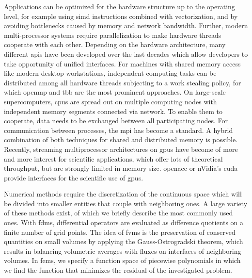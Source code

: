 
Applications can be optimized for the hardware structure up to the operating level, for example using \gls{simd} instructions combined with vectorization, and by avoiding bottlenecks caused by memory and network bandwidth.
Further, modern multi-processor systems require parallelization to make hardware threads cooperate with each other.%
Depending on the hardware architecture, many different \glspl{api} have been developed over the last decades which allow developers to take opportunity of unified interfaces.
For machines with shared memory access like modern desktop workstations, independent computing tasks can be distributed among all hardware threads subjecting to a work stealing policy, for which \gls{openmp} \textcite{openmp50} and \gls{tbb} \textcite{tbb2018} are the most prominent approaches.
On large-scale supercomputers, \glspl{cpu} are spread out on multiple computing nodes with independent memory segments connected via network. To enable them to cooperate, data needs to be exchanged between all participating nodes. For communication between processes, the \gls{mpi} \textcite{mpi31} has become a standard. A hybrid combination of both techniques for shared and distributed memory is possible.
Recently, streaming multiprocessor architectures on \glspl{gpu} have become of more and more interest for scientific applications, which offer lots of theoretical throughput, but are strongly limited in memory size. \gls{openacc} \textcite{openacc27} or nVidia's \gls{cuda} \textcite{cuda10} provide interfaces for the scientific use of \glspl{gpu}.


Numerical methods require the discretization of the continuous space which will be divided into smaller entities that couple with neighboring ones. A large variety of these methods exist, of which we briefly describe the most commonly used ones.
With \glspl{fdm}, differential operators are evaluated as difference quotients on a finite number of grid points. %
The idea of \glspl{fvm} is the preservation of conserved quantities on small volumes by applying the Gauss-Ostrogradski theorem, which results in balancing volumetric averages with fluxes on interfaces of neighboring volumes.
In \glspl{fem}, we specify a function space of piecewise polynomials in which we find the function 
that minimizes the residual of the investigated problem.

